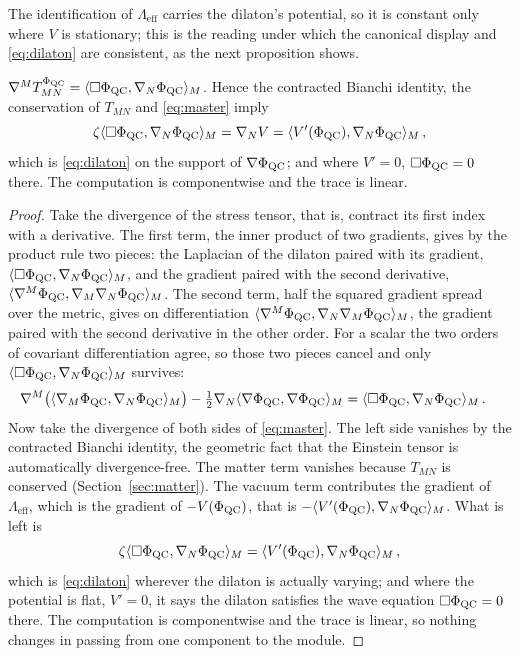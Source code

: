 The identification of $\Lambda_{\mathrm{eff}}$ carries the dilaton's
potential, so it is constant only where $V$ is stationary; this is the
reading under which the canonical display and \eqref{eq:dilaton} are
consistent, as the next proposition shows.

\begin{proposition}[consistency]\label{prop:bianchi}
$\nabla^{M}T^{\Phi_{\mathrm{QC}}}_{MN}=\langle\Box\Phi_{\mathrm{QC}},\nabla_{N}\Phi_{\mathrm{QC}}\rangle_{M}$. Hence the contracted
Bianchi identity, the conservation of $T_{MN}$ and \eqref{eq:master} imply
\[
\zeta\langle\Box\Phi_{\mathrm{QC}},\nabla_{N}\Phi_{\mathrm{QC}}\rangle_{M}=\nabla_{N}V=\langle V'(\Phi_{\mathrm{QC}}),\nabla_{N}\Phi_{\mathrm{QC}}\rangle_{M}\,,
\]
which is \eqref{eq:dilaton} on the support of $\nabla\Phi_{\mathrm{QC}}$; and where
$V'=0$, $\Box\Phi_{\mathrm{QC}}=0$ there. The computation is componentwise and the trace
is linear.
\end{proposition}

\begin{proof}
Take the divergence of the stress tensor, that is, contract its first
index with a derivative. The first term, the inner product of two
gradients, gives by the product rule two pieces: the Laplacian of the
dilaton paired with its gradient, $\langle\Box\Phi_{\mathrm{QC}},\nabla_{N}\Phi_{\mathrm{QC}}\rangle_{M}$,
and the gradient paired with the second derivative,
$\langle\nabla^{M}\Phi_{\mathrm{QC}},\nabla_{M}\nabla_{N}\Phi_{\mathrm{QC}}\rangle_{M}$. The second term,
half the squared gradient spread over the metric, gives on differentiation
$\langle\nabla^{M}\Phi_{\mathrm{QC}},\nabla_{N}\nabla_{M}\Phi_{\mathrm{QC}}\rangle_{M}$, the gradient
paired with the second derivative in the other order. For a scalar the two
orders of covariant differentiation agree, so those two pieces cancel and
only $\langle\Box\Phi_{\mathrm{QC}},\nabla_{N}\Phi_{\mathrm{QC}}\rangle_{M}$ survives:
\begin{align*}
\nabla^{M}\bigl(\langle\nabla_{M}\Phi_{\mathrm{QC}},\nabla_{N}\Phi_{\mathrm{QC}}\rangle_{M}\bigr)-\tfrac12\nabla_{N}\langle\nabla\Phi_{\mathrm{QC}},\nabla\Phi_{\mathrm{QC}}\rangle_{M}
&=\langle\Box\Phi_{\mathrm{QC}},\nabla_{N}\Phi_{\mathrm{QC}}\rangle_{M}\,.
\end{align*}
Now take the divergence of both sides of \eqref{eq:master}. The left side
vanishes by the contracted Bianchi identity, the geometric fact that the
Einstein tensor is automatically divergence-free. The matter term vanishes
because $T_{MN}$ is conserved (Section~\ref{sec:matter}). The vacuum term
contributes the gradient of $\Lambda_{\mathrm{eff}}$, which is the gradient
of $-V(\Phi_{\mathrm{QC}})$, that is $-\langle V'(\Phi_{\mathrm{QC}}),\nabla_{N}\Phi_{\mathrm{QC}}\rangle_{M}$. What is
left is
\[
\zeta\langle\Box\Phi_{\mathrm{QC}},\nabla_{N}\Phi_{\mathrm{QC}}\rangle_{M}=\langle V'(\Phi_{\mathrm{QC}}),\nabla_{N}\Phi_{\mathrm{QC}}\rangle_{M}\,,
\]
which is \eqref{eq:dilaton} wherever the dilaton is actually varying; and
where the potential is flat, $V'=0$, it says the dilaton satisfies the wave
equation $\Box\Phi_{\mathrm{QC}}=0$ there. The computation is componentwise and the trace
is linear, so nothing changes in passing from one component to the module.
\rigR
\end{proof}

